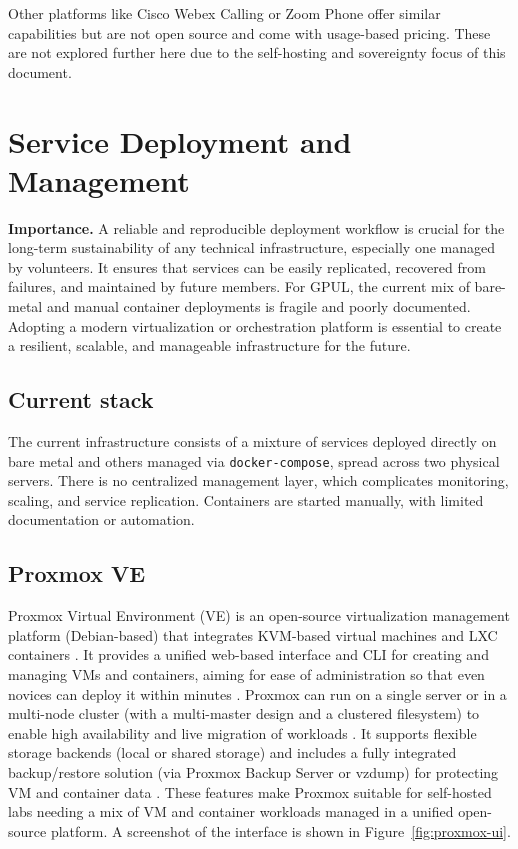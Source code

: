 Other platforms like Cisco Webex Calling or Zoom Phone offer similar capabilities but are not open source and come with usage-based pricing. These are not explored further here due to the self-hosting and sovereignty focus of this document.

\section{Service Deployment and Management}

\textbf{Importance.} A reliable and reproducible deployment workflow is crucial for the long-term sustainability of any technical infrastructure, especially one managed by volunteers. It ensures that services can be easily replicated, recovered from failures, and maintained by future members. For GPUL, the current mix of bare-metal and manual container deployments is fragile and poorly documented. Adopting a modern virtualization or orchestration platform is essential to create a resilient, scalable, and manageable infrastructure for the future.

\subsection*{Current stack}
The current infrastructure consists of a mixture of services deployed directly on bare metal and others managed via \texttt{docker-compose}, spread across two physical servers. There is no centralized management layer, which complicates monitoring, scaling, and service replication. Containers are started manually, with limited documentation or automation.

\subsection*{Proxmox VE}

Proxmox Virtual Environment (VE) is an open-source virtualization management platform (Debian-based) that integrates KVM-based virtual machines and LXC containers \cite{proxmox-admin-guide-2025}. It provides a unified web-based interface and CLI for creating and managing VMs and containers, aiming for ease of administration so that even novices can deploy it within minutes . Proxmox can run on a single server or in a multi-node cluster (with a multi-master design and a clustered filesystem) to enable high availability and live migration of workloads . It supports flexible storage backends (local or shared storage) and includes a fully integrated backup/restore solution (via Proxmox Backup Server or vzdump) for protecting VM and container data . These features make Proxmox suitable for self-hosted labs needing a mix of VM and container workloads managed in a unified open-source platform. A screenshot of the interface is shown in Figure~\ref{fig:proxmox-ui}.

